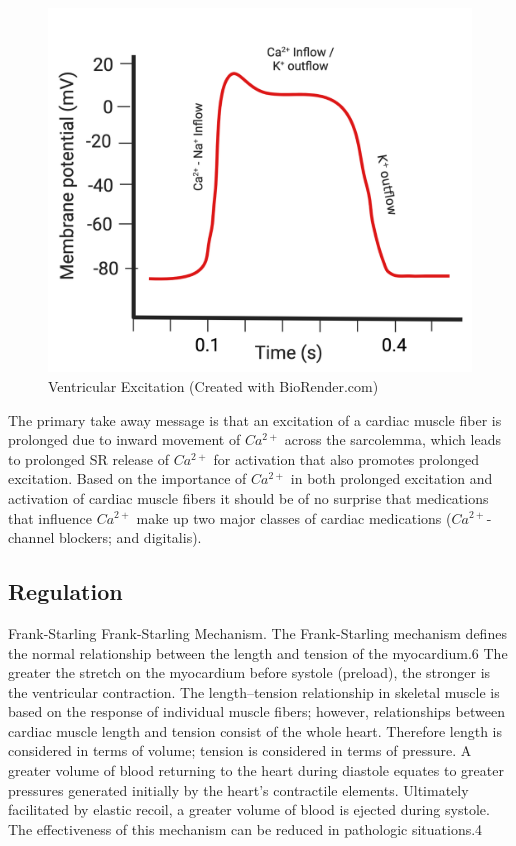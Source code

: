 \begin{figure}[!h]
    \centering
    \includegraphics[width=1\linewidth]{./figure/Cardiac_Ventricular_AP.png}
    \caption{Ventricular Excitation \footnotesize{(Created with BioRender.com)}}
    \label{fig:Cardiac_Ventricular_AP}
\end{figure}

The primary take away message is that an excitation of a cardiac muscle fiber is prolonged due to inward movement of $Ca^{2+}$ across the sarcolemma, which leads to prolonged SR release of $Ca^{2+}$ for activation that also promotes prolonged excitation. Based on the importance of $Ca^{2+}$ in both prolonged excitation and activation of cardiac muscle fibers it should be of no surprise that medications that influence $Ca^{2+}$ make up two major classes of cardiac medications ($Ca^{2+}$-channel blockers; and digitalis).


\subsection{Regulation}

Frank-Starling
Frank-Starling Mechanism.
The Frank-Starling mechanism defines the normal relationship between the length and tension of the myocardium.6 The greater the stretch on the myocardium before systole (preload), the stronger is the ventricular contraction. The length–tension relationship in skeletal muscle is based on the response of individual muscle fibers; however, relationships between cardiac muscle length and tension consist of the whole heart. Therefore length is considered in terms of volume; tension is considered in terms of pressure. A greater volume of blood returning to the heart during diastole equates to greater pressures generated initially by the heart’s contractile elements. Ultimately facilitated by elastic recoil, a greater volume of blood is ejected during systole. The effectiveness of this mechanism can be reduced in pathologic situations.4


